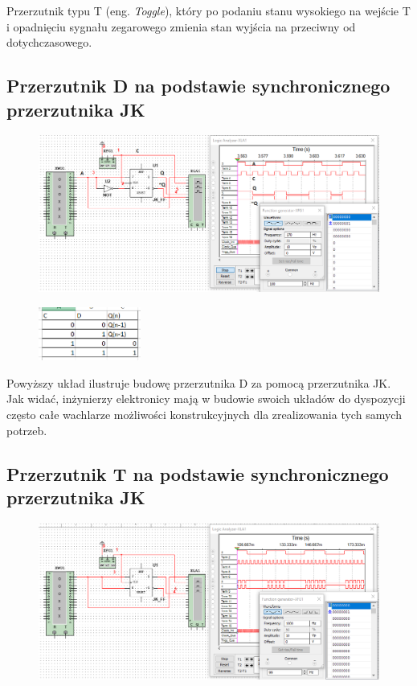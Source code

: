 \documentclass[12pt,a4paper]{article}
\begin{document}
Przerzutnik typu T (eng. \textit{Toggle}), który po podaniu stanu wysokiego na wejście T i opadnięciu sygnału zegarowego zmienia stan wyjścia na przeciwny od dotychczasowego.



\subsection{Przerzutnik D na podstawie synchronicznego przerzutnika JK}
\begin{figure}[H]
\centering
\includegraphics[width=\textwidth]{img/3f}
\end{figure}
\begin{figure}[H]
\centering
\includegraphics[width=0.3\textwidth]{img/3dTruthTable}
\end{figure}

Powyższy układ ilustruje budowę przerzutnika D za pomocą przerzutnika JK. Jak widać, inżynierzy elektronicy mają w budowie swoich układów do dyspozycji często całe wachlarze możliwości konstrukcyjnych dla zrealizowania tych samych potrzeb.


\subsection{Przerzutnik T na podstawie synchronicznego przerzutnika JK}
\begin{figure}[H]
\centering
\includegraphics[width=\textwidth]{img/3g}
\end{figure}
\end{document}
